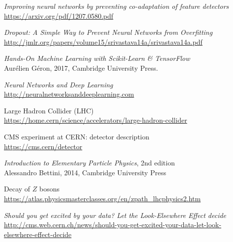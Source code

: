 \begin{thebibliography}{99}
\textit{Improving neural networks by preventing co-adaptation of feature detectors}
\\\url{https://arxiv.org/pdf/1207.0580.pdf}

\textit{Dropout: A Simple Way to Prevent Neural Networks from Overfitting}
\\\url{http://jmlr.org/papers/volume15/srivastava14a/srivastava14a.pdf}

\textit{Hands-On Machine Learning with Scikit-Learn \& TensorFlow}
\\Aurélien Géron, 2017, Cambridge University Press.

\textit{Neural Networks and Deep Learning}
\\\url{http://neuralnetworksanddeeplearning.com}

Large Hadron Collider (LHC)
\\\url{https://home.cern/science/accelerators/large-hadron-collider}

CMS experiment at \textsc{CERN}: detector description
\\\url{https://cms.cern/detector}

\textit{Introduction to Elementary Particle Physics}, 2nd edition
\\Alessandro Bettini, 2014, Cambridge University Press

Decay of $Z$ bosons
\\\url{https://atlas.physicsmasterclasses.org/en/zpath_lhcphysics2.htm}

\textit{Should you get excited by your data? Let the Look-Elsewhere Effect decide}
\\\url{http://cms.web.cern.ch/news/should-you-get-excited-your-data-let-look-elsewhere-effect-decide}
\end{thebibliography}